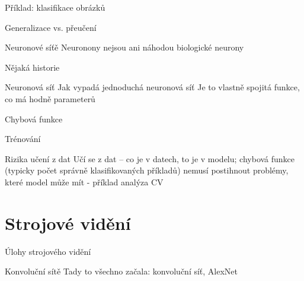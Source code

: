 \documentclass[aspectratio=169,dvipsnames,handout]{beamer}
\begin{document}
\begin{frame}{Příklad: klasifikace obrázků}
\end{frame}

\begin{frame}{Generalizace vs. přeučení}
\end{frame}

\begin{frame}{Neuronové síťě}
Neuronony nejsou ani náhodou biologické neurony

Nějaká historie
\end{frame}

\begin{frame}{Neuronová síť}
Jak vypadá jednoduchá neuronová síť
Je to vlastně spojitá funkce, co má hodně parameterů
\end{frame}

\begin{frame}{Chybová funkce}
\end{frame}

\begin{frame}{Trénování}
\end{frame}

\begin{frame}{Rizika učení z dat}
Učí se z dat -- co je v datech, to je v modelu; chybová funkce (typicky počet správně klasifikovaných příkladů) nemusí postihnout problémy, které model může mít - příklad analýza CV

\end{frame}

\begin{frame}{}
\end{frame}


\section{Strojové vidění}

\begin{frame}{Úlohy strojového vidění}
\end{frame}

\begin{frame}{Konvoluční sítě}
Tady to všechno začala: konvoluční síť, AlexNet

    \scalebox{0.8}{}

\end{frame}

\end{document}
